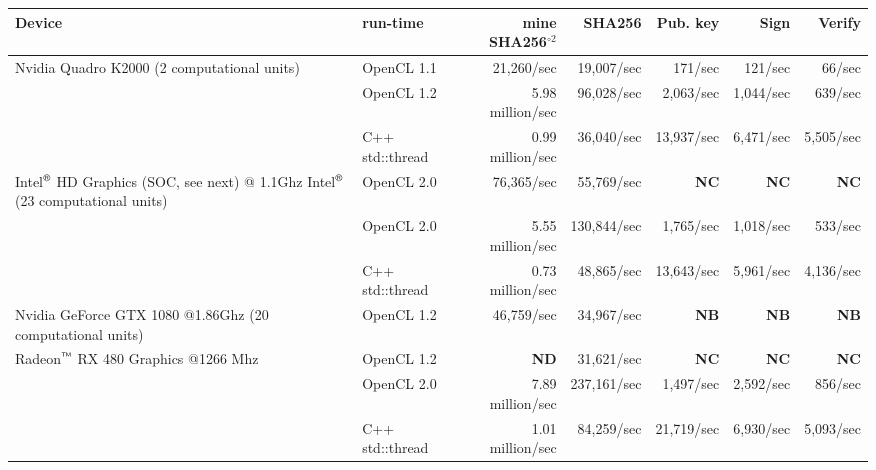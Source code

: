 \documentclass{article}
\newcommand{\NotRanDueToDriverIssues}{\textbf{\color{orange}ND}}
\newcommand{\NotCorrect}{\textbf{\color{red}NC}}
\newcommand{\NotBuilding}{\textbf{\color{red}NB}}
\begin{document}
\noindent\begin{tabular}{|p{5.5cm}|l|r|r||r|r|r|}\hline
	Device & run-time &mine SHA256$^{\circ2}$& SHA256 & Pub. key & Sign & Verify\\\hline
	Nvidia Quadro K2000 (2 computational units) & OpenCL 1.1 &21,260/sec &19,007/sec & 171/sec & 121/sec & 66/sec\\\hline
	 & OpenCL 1.2 &5.98 million/sec &96,028/sec & 2,063/sec& 1,044/sec & 639/sec\\ 
	& C++ std::thread& 0.99 million/sec& 36,040/sec&13,937/sec&6,471/sec& 5,505/sec \\\hline\hline
	Intel${}^{\text{\sffamily\textregistered}}$ HD Graphics (SOC, see next) @ 1.1Ghz Intel${}^{\text{\sffamily\textregistered}}$ (23 computational units) & OpenCL 2.0& 76,365/sec  & 55,769/sec& \NotCorrect & \NotCorrect & \NotCorrect \\\hline
	 & OpenCL 2.0 & 5.55 million/sec &130,844/sec& 1,765/sec &1,018/sec& 533/sec\\
	&C++ std::thread& 0.73 million/sec  &48,865/sec& 13,643/sec&5,961/sec&4,136/sec \\\hline\hline
	
	Nvidia GeForce GTX 1080 @1.86Ghz (20 computational units) &OpenCL 1.2&{\color{red} 46,759/sec} &34,967/sec&\NotBuilding &\NotBuilding&\NotBuilding\\\hline
	
	Radeon${}^{\text{\sffamily\texttrademark}}$ RX 480 Graphics @1266 Mhz &OpenCL 1.2&\NotRanDueToDriverIssues  &31,621/sec& \NotCorrect & \NotCorrect & \NotCorrect
	\\\hline
	
	&OpenCL 2.0&7.89 million/sec  &237,161/sec & 1,497/sec & 2,592/sec&  856/sec\\
	&C++ std::thread &1.01 million/sec&84,259/sec&21,719/sec&6,930/sec&5,093/sec\\\hline
\end{tabular}
\end{document}
